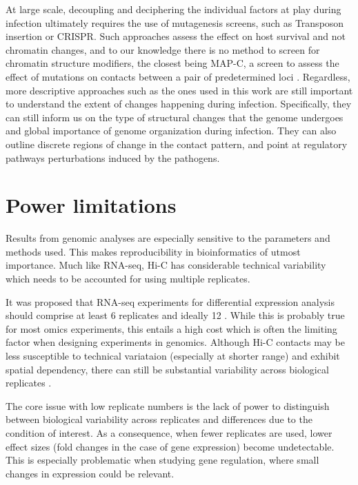 At large scale, decoupling and deciphering the individual factors at play during infection ultimately requires the use of mutagenesis screens, such as Transposon insertion or CRISPR. Such approaches assess the effect on host survival and not chromatin changes, and to our knowledge there is no method to screen for chromatin structure modifiers, the closest being MAP-C, a screen to assess the effect of mutations on contacts between a pair of predetermined loci \cite{kimCombinationTranscriptionFactors2019}. Regardless, more descriptive approaches such as the ones used in this work are still important to understand the extent of changes happening during infection. Specifically, they can still inform us on the type of structural changes that the genome undergoes and global importance of genome organization during infection. They can also outline discrete regions of change in the contact pattern, and point at regulatory pathways perturbations induced by the pathogens.

\section{Power limitations}
Results from genomic analyses are especially sensitive to the parameters and methods used. This makes reproducibility in bioinformatics of utmost importance. Much like RNA-seq, Hi-C has considerable technical variability which needs to be accounted for using multiple replicates.

It was proposed that RNA-seq experiments for differential expression analysis should comprise at least 6 replicates and ideally 12 \cite{schurchHowManyBiological2016}. While this is probably true for most omics experiments, this entails a high cost which is often the limiting factor when designing experiments in genomics. Although Hi-C contacts may be less susceptible to technical variataion (especially at shorter range) and exhibit spatial dependency, there can still be substantial variability across biological replicates \cite{yangHiCRepAssessingReproducibility}.

The core issue with low replicate numbers is the lack of power to distinguish between biological variability across replicates and differences due to the condition of interest. As a consequence, when fewer replicates are used, lower effect sizes (fold changes in the case of gene expression) become undetectable. This is especially problematic when studying gene regulation, where small changes in expression could be relevant.

